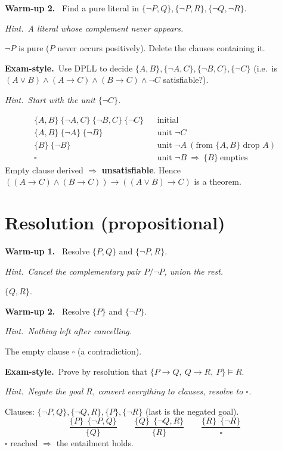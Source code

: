 \documentclass[11pt,a4paper]{article}
\newcommand{\hint}[1]{\par{\small\textcolor{accent}{\textit{Hint.}}\ \textit{#1}}\par\smallskip}
\newcommand{\warm}[1]{\smallskip\textbf{\textcolor{hi}{Warm-up #1.}}\ }
\newcommand{\exam}{\smallskip\textbf{\textcolor{warn}{Exam-style.}}\ }
\newcommand{\imp}{\rightarrow}
\begin{document}
\warm{2} Find a pure literal in $\{\neg P,Q\},\{\neg P,R\},\{\neg Q,\neg R\}$.
\hint{A literal whose complement never appears.}
\begin{sol}$\neg P$ is pure ($P$ never occurs positively). Delete the clauses containing it.\end{sol}

\exam Use DPLL to decide $\{A,B\},\{\neg A,C\},\{\neg B,C\},\{\neg C\}$ (i.e.\ is $(A\vee B)\wedge(A\imp C)\wedge(B\imp C)\wedge\neg C$ satisfiable?).
\hint{Start with the unit $\{\neg C\}$.}
\begin{sol}
\[
\begin{array}{lll}
\{A,B\}\ \{\neg A,C\}\ \{\neg B,C\}\ \{\neg C\} & & \text{initial}\\
\{A,B\}\ \{\neg A\}\ \{\neg B\} & & \text{unit }\neg C\\
\{B\}\ \{\neg B\} & & \text{unit }\neg A\ (\text{from }\{A,B\}\text{ drop }A)\\
\square & & \text{unit }\neg B\ \Rightarrow\ \{B\}\ \text{empties}
\end{array}
\]
Empty clause derived $\Rightarrow$ \textbf{unsatisfiable}. Hence $((A\imp C)\wedge(B\imp C))\imp((A\vee B)\imp C)$ is a theorem.
\end{sol}

\section{Resolution (propositional)}

\warm{1} Resolve $\{P,Q\}$ and $\{\neg P,R\}$.
\hint{Cancel the complementary pair $P/\neg P$, union the rest.}
\begin{sol}$\{Q,R\}$.\end{sol}

\warm{2} Resolve $\{P\}$ and $\{\neg P\}$.
\hint{Nothing left after cancelling.}
\begin{sol}The empty clause $\square$ (a contradiction).\end{sol}

\exam Prove by resolution that $\{P\imp Q,\ Q\imp R,\ P\}\models R$.
\hint{Negate the goal $R$, convert everything to clauses, resolve to $\square$.}
\begin{sol}
Clauses: $\{\neg P,Q\},\{\neg Q,R\},\{P\},\{\neg R\}$ (last is the negated goal).
\[
\frac{\{P\}\ \ \{\neg P,Q\}}{\{Q\}}\qquad
\frac{\{Q\}\ \ \{\neg Q,R\}}{\{R\}}\qquad
\frac{\{R\}\ \ \{\neg R\}}{\square}
\]
$\square$ reached $\Rightarrow$ the entailment holds.
\end{sol}
\end{document}
